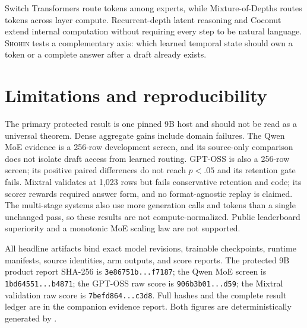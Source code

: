 \documentclass[10pt]{article}
\newcommand{\shohin}{\textsc{Shohin}}
\begin{document}
Switch Transformers \cite{fedus2021switch} route tokens among experts, while
Mixture-of-Depths \cite{raposo2024mod} routes tokens across layer compute.
Recurrent-depth latent reasoning \cite{geiping2025recurrent} and Coconut
\cite{hao2024coconut} extend internal computation without requiring every step
to be natural language. \shohin{} tests a complementary axis: which learned
temporal state should own a token or a complete answer after a draft already
exists.

\section{Limitations and reproducibility}

The primary protected result is one pinned 9B host and should not be read as a
universal theorem. Dense aggregate gains include domain failures. The Qwen MoE
evidence is a 256-row development screen, and its source-only comparison does
not isolate draft access from learned routing. GPT-OSS is also a 256-row
screen; its positive paired differences do not reach $p<.05$ and its
retention gate fails. Mixtral validates at 1,023 rows
but fails conservative retention and code; its scorer rewards required answer
form, and no format-agnostic replay is claimed. The multi-stage systems also
use more generation calls and tokens than a single unchanged pass, so these
results are not compute-normalized. Public leaderboard superiority and a
monotonic MoE scaling law are not supported.

All headline artifacts bind exact model revisions, trainable checkpoints,
runtime manifests, source identities, arm outputs, and score reports. The
protected 9B product report SHA-256 is
\texttt{3e86751b...f7187}; the Qwen MoE screen is
\texttt{1bd64551...b4871}; the GPT-OSS raw score is
\texttt{906b3b01...d59}; the Mixtral validation raw score is
\texttt{7befd864...c3d8}. Full hashes and the complete result ledger are in the
companion evidence report. Both figures are deterministically generated by
.

\begingroup
\scriptsize


\endgroup
\end{document}
